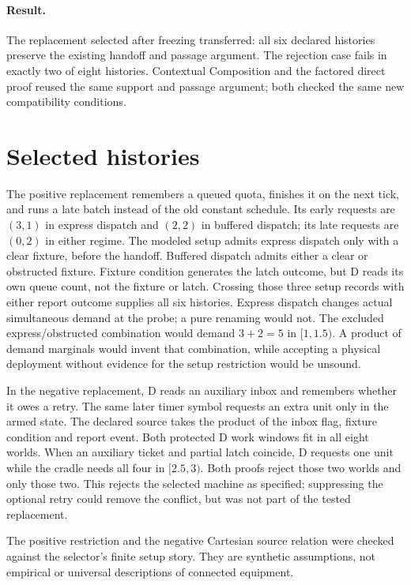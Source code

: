 \paragraph{Result.} The replacement selected after freezing transferred: all six declared histories preserve the existing handoff and passage argument. The rejection case fails in exactly two of eight histories. Contextual Composition and the factored direct proof reused the same support and passage argument; both checked the same new compatibility conditions.

\section{Selected histories}
The positive replacement remembers a queued quota, finishes it on the next tick, and runs a late batch instead of the old constant schedule. Its early requests are \((3,1)\) in express dispatch and \((2,2)\) in buffered dispatch; its late requests are \((0,2)\) in either regime. The modeled setup admits express dispatch only with a clear fixture, before the handoff. Buffered dispatch admits either a clear or obstructed fixture. Fixture condition generates the latch outcome, but D reads its own queue count, not the fixture or latch. Crossing those three setup records with either report outcome supplies all six histories. Express dispatch changes actual simultaneous demand at the probe; a pure renaming would not. The excluded express/obstructed combination would demand \(3+2=5\) in \([1,1.5)\). A product of demand marginals would invent that combination, while accepting a physical deployment without evidence for the setup restriction would be unsound.

In the negative replacement, D reads an auxiliary inbox and remembers whether it owes a retry. The same later timer symbol requests an extra unit only in the armed state. The declared source takes the product of the inbox flag, fixture condition and report event. Both protected D work windows fit in all eight worlds. When an auxiliary ticket and partial latch coincide, D requests one unit while the cradle needs all four in \([2.5,3)\). Both proofs reject those two worlds and only those two. This rejects the selected machine as specified; suppressing the optional retry could remove the conflict, but was not part of the tested replacement.

The positive restriction and the negative Cartesian source relation were checked against the selector's finite setup story. They are synthetic assumptions, not empirical or universal descriptions of connected equipment.
